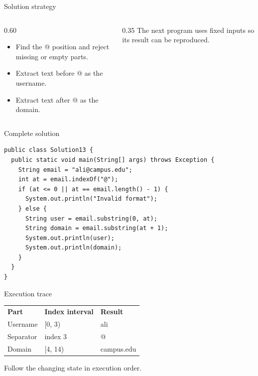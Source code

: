 \documentclass[10pt,aspectratio=169]{beamer}
\begin{document}
\begin{frame}[fragile,t]{Solution strategy}
\begin{columns}[T,onlytextwidth]\begin{column}{0.60\textwidth}
\begin{itemize}
\item Find the @ position and reject missing or empty parts.
\item Extract text before @ as the username.
\item Extract text after @ as the domain.
\end{itemize}
\end{column}\begin{column}{0.35\textwidth}\small
The next program uses fixed inputs so its result can be reproduced.
\end{column}\end{columns}
\end{frame}

\begin{frame}[fragile,t]{Complete solution}
\begin{lstlisting}
public class Solution13 {
  public static void main(String[] args) throws Exception {
    String email = "ali@campus.edu";
    int at = email.indexOf("@");
    if (at <= 0 || at == email.length() - 1) {
      System.out.println("Invalid format");
    } else {
      String user = email.substring(0, at);
      String domain = email.substring(at + 1);
      System.out.println(user);
      System.out.println(domain);
    }
  }
}
\end{lstlisting}
\end{frame}

\begin{frame}[fragile,t]{Execution trace}
\small\renewcommand{\arraystretch}{1.5}
\begin{tabularx}{\textwidth}{>{\raggedright\arraybackslash}X>{\raggedright\arraybackslash}X>{\raggedright\arraybackslash}X}
\rowcolor{navy}
\color{white}\bfseries Part & \color{white}\bfseries Index interval & \color{white}\bfseries Result\\
Username & [0, 3) & ali\\
Separator & index 3 & @\\
Domain & [4, 14) & campus.edu\\
\end{tabularx}
\vspace{3mm}\footnotesize Follow the changing state in execution order.
\end{frame}
\end{document}
